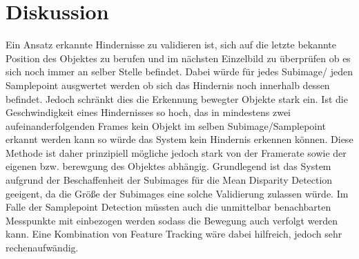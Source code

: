 \section{Diskussion}
\label{sec:conflict_discussion}
Ein Ansatz erkannte Hindernisse zu validieren ist, sich auf die letzte bekannte Position des Objektes zu berufen und im nächsten Einzelbild zu überprüfen ob es sich noch immer an selber Stelle befindet. Dabei würde für jedes Subimage/ jeden Samplepoint ausgwertet werden ob sich das Hindernis noch innerhalb dessen befindet. Jedoch schränkt dies die Erkennung bewegter Objekte stark ein. Ist die Geschwindigkeit eines Hindernisses so hoch, das in mindestens zwei aufeinanderfolgenden Frames kein Objekt im selben Subimage/Samplepoint erkannt werden kann so würde das System kein Hindernis erkennen können. Diese Methode ist daher prinzipiell mögliche jedoch stark von der Framerate sowie der eigenen bzw. berewgung des Objektes abhängig. Grundlegend ist das System aufgrund der Beschaffenheit der Subimages für die Mean Disparity Detection geeigent, da die Größe der Subimages eine solche Validierung zulassen würde. Im Falle der Samplepoint Detection müssten auch die unmittelbar benachbarten Messpunkte mit einbezogen werden sodass die Bewegung auch verfolgt werden kann. Eine Kombination von Feature Tracking wäre dabei hilfreich, jedoch sehr rechenaufwändig.
    


